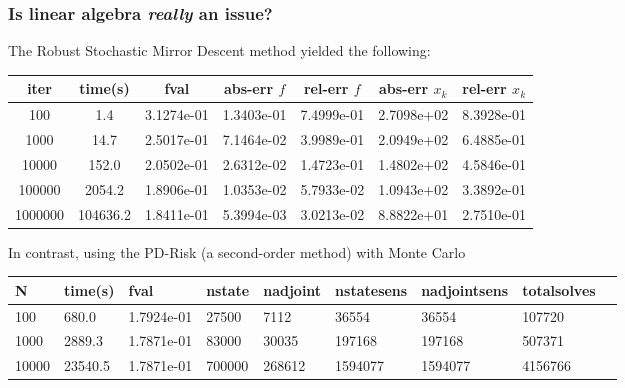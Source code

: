 \documentclass[aspectratio=169,xcolor=dvipsnames,10pt]{beamer}
\begin{document}
\begin{frame}\frametitle{Is linear algebra \textit{\alert{really}} an issue?}
\begin{exampleblock}{}
\smaller
 The Robust Stochastic Mirror Descent method yielded the following:
 \begin{table}[]
\begin{tabular}{|c|c|c|c|c|c|c|}
\hline
iter  & time(s) & fval & abs-err $f$  & rel-err $f$  & abs-err $x_k$  &  rel-err $x_k$ \\
\hline
100         &  1.4     &   3.1274e-01 &   1.3403e-01 &    7.4999e-01 &   2.7098e+02  &  8.3928e-01\\
1000        & 14.7    & 2.5017e-01   & 7.1464e-02   &  3.9989e-01  &  2.0949e+02  &  6.4885e-01 \\
10000      & 152.0   &  2.0502e-01  &  2.6312e-02   &  1.4723e-01  &  1.4802e+02  &  4.5846e-01\\
100000    & 2054.2   &  1.8906e-01  &  1.0353e-02  &   5.7933e-02  &  1.0943e+02  &  3.3892e-01\\
{1000000}  & 104636.2  &   1.8411e-01 &   5.3994e-03 &    3.0213e-02 &   8.8822e+01 &   {2.7510e-01}\\
\hline
\end{tabular}
\end{table}

In contrast, using the PD-Risk (a second-order method) with Monte Carlo
\begin{table}[]
\begin{tabular}{|l|l|l|l|l|l|l|l|l|}%
\hline

N   &      time(s)      &                 fval  &    nstate &   nadjoint  & nstatesens &  nadjointsens  & totalsolves \\
\hline
100     &    680.0    & 1.7924e-01    &   27500   &     7112    &    36554    &      36554    &    107720 \\
1000    &   2889.3   &  1.7871e-01   &    83000   &    30035    &   197168      &   197168    &    507371 \\
10000   &  23540.5   &  1.7871e-01  &    700000  &    268612    &  1594077    &    1594077     &  4156766 \\
%
 \hline
\end{tabular}
\end{table}
\end{exampleblock}
\end{frame}

\end{document}
